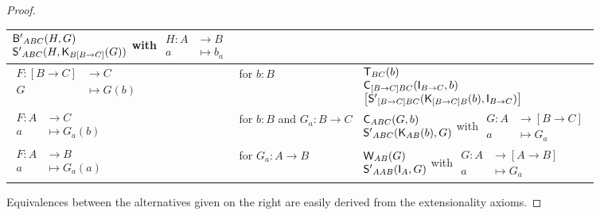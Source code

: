 \documentclass[a4paper]{article}
\theoremstyle{definition}
\theoremstyle{remark}
\newcommand{\nm}{\mathsf}
\newcommand{\combinator}{\nm}
\newcommand{\idFun}{\combinator{I}}
\newcommand{\revAppFun}{\combinator{T}}
\newcommand{\constFun}{\combinator{K}}
\newcommand{\compFun}{\combinator{B'}}
\newcommand{\swapFun}{\combinator{C}}
\newcommand{\dupFun}{\combinator{W}}
\newcommand{\substFun}{\combinator{S'}}
\begin{document}
\begin{proof}
\begin{tabular}{ll|l}
    $\begin{array}{@{}l@{}}
      \compFun_{ABC}(H,G)\\
      \substFun_{ABC}(H,\constFun_{B[B{\to}C]}(G))
    \end{array}$
    with
    $\begin{aligned}
      H : A &\to     B\\
          a &\mapsto b_a
    \end{aligned}$\\
    \hline
    \rule{0pt}{2.5em}
    $\begin{aligned}
      F : [B \to C] &\to     C\\
          G         &\mapsto G(b)
    \end{aligned}$ &
    for $b : B$ &
    $\begin{array}{@{}l@{}}
      \revAppFun_{BC}(b)\\
      \swapFun_{[B{\to}C]BC}(\idFun_{B{\to}C},b)\\
      \left[\substFun_{[B{\to}C]BC}(\constFun_{[B{\to}C]B}(b),\idFun_{B{\to}C})\right]
    \end{array}$\\
    \hline
    \rule{0pt}{2em}
    $\begin{aligned}
      F : A &\to     C\\
          a &\mapsto G_a(b)
    \end{aligned}$ &
    \parbox{3cm}{for $b : B$ \\ and $G_a : B \to C$} &
    $\begin{array}{@{}l@{}}
      \swapFun_{ABC}(G,b)\\
      \substFun_{ABC}(\constFun_{AB}(b),G)
    \end{array}$
    with
    $\begin{aligned}
      G : A &\to     [B \to C]\\
          a &\mapsto G_a
    \end{aligned}$\\
    \hline
    \rule{0pt}{2em}
    $\begin{aligned}
      F : A &\to     B\\
          a &\mapsto G_a(a)
    \end{aligned}$ &
    for $G_a : A \to B$ &
    $\begin{array}{@{}l@{}}
      \dupFun_{AB}(G)\\
      \substFun_{AAB}(\idFun_A,G)
    \end{array}$
    with
    $\begin{aligned}
      G : A &\to     [A \to B]\\
          a &\mapsto G_a
    \end{aligned}$
  \end{tabular}

  Equivalences between the alternatives given on the right are easily derived from
  the extensionality axioms.
\end{proof}
\end{document}

